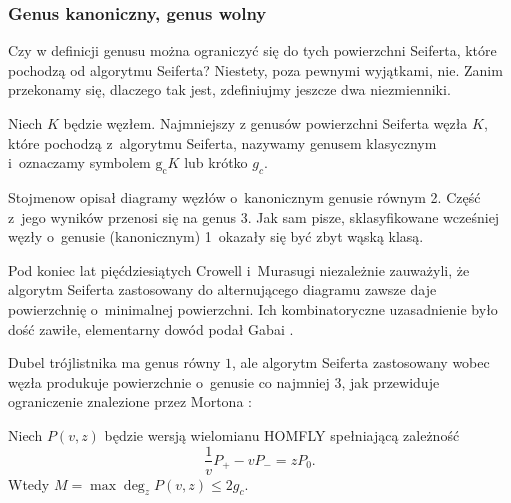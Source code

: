 
\subsubsection{Genus kanoniczny, genus wolny}
Czy w definicji genusu można ograniczyć się do tych powierzchni Seiferta, które pochodzą od algorytmu Seiferta?
%
Niestety, poza pewnymi wyjątkami, nie.
Zanim przekonamy się, dlaczego tak jest, zdefiniujmy jeszcze dwa niezmienniki.

\begin{definition}
%
    Niech $K$ będzie węzłem.
    Najmniejszy z genusów powierzchni Seiferta węzła $K$, które pochodzą z~algorytmu Seiferta, nazywamy genusem klasycznym i~oznaczamy symbolem $\operatorname{g_c} K$ lub krótko $g_c$.
\end{definition}

Stojmenow \cite{stoimenow08} opisał diagramy węzłów o~kanonicznym genusie równym 2.
%
Część z~jego wyników przenosi się na genus 3.
Jak sam pisze, sklasyfikowane wcześniej węzły o~genusie (kanonicznym) 1~okazały się być zbyt wąską klasą.

Pod koniec lat pięćdziesiątych Crowell i~Murasugi niezależnie zauważyli, że algorytm Seiferta zastosowany do alternującego diagramu zawsze daje powierzchnię o~minimalnej powierzchni.
%
%
Ich kombinatoryczne uzasadnienie było dość zawiłe, elementarny dowód podał Gabai \cite{gabai86}.
%

Dubel trójlistnika ma genus równy $1$, ale algorytm Seiferta zastosowany wobec węzła produkuje powierzchnie o~genusie co najmniej $3$, jak przewiduje ograniczenie znalezione przez Mortona \cite[twierdzenie 2]{morton86}:
%

\begin{proposition}
    Niech $P(v, z)$ będzie wersją wielomianu HOMFLY spełniającą zależność
    \begin{equation}
        \frac 1v P_+ - vP_- = zP_0.
    \end{equation}
    Wtedy $M = \max \deg_z P(v, z) \le 2g_c$.
%
\end{proposition}

